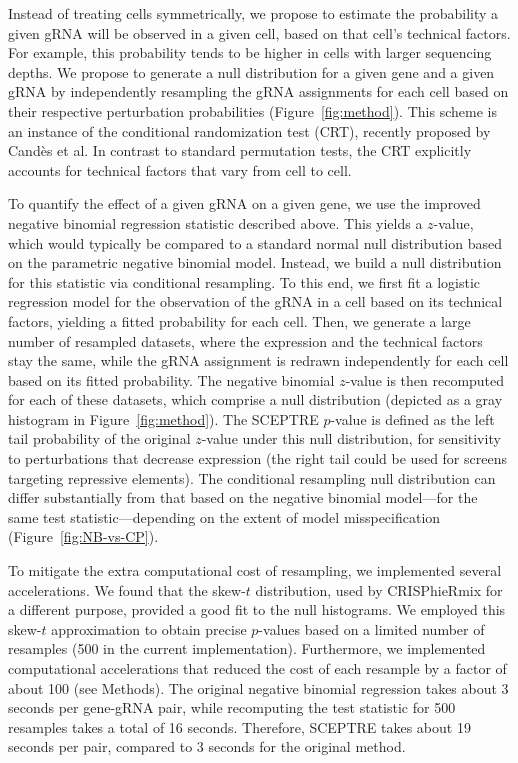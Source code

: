 \documentclass{nature}
\begin{document}
Instead of treating cells symmetrically, we propose to estimate the probability a given gRNA will be observed in a given cell, based on that cell's technical factors. For example, this probability tends to be higher in cells with larger sequencing depths. We propose to generate a null distribution for a given gene and a given gRNA by independently resampling the gRNA assignments for each cell based on their respective perturbation probabilities (Figure~\ref{fig:method}). This scheme is an instance of the conditional randomization test (CRT), recently proposed by Cand\`{e}s et al.\cite{CetL16} In contrast to standard permutation tests, the CRT explicitly accounts for technical factors that vary from cell to cell.

To quantify the effect of a given gRNA on a given gene, we use the improved negative binomial regression statistic described above. This yields a $z$-value, which would typically be compared to a standard normal null distribution based on the parametric negative binomial model. Instead, we build a null distribution for this statistic via conditional resampling. To this end, we first fit a logistic regression model for the observation of the gRNA in a cell based on its technical factors, yielding a fitted probability for each cell. Then, we generate a large number of resampled datasets, where the expression and the technical factors stay the same, while the gRNA assignment is redrawn independently for each cell based on its fitted probability. The negative binomial $z$-value is then recomputed for each of these datasets, which comprise a null distribution (depicted as a gray histogram in Figure~\ref{fig:method}). The SCEPTRE $p$-value is defined as the left tail probability of the original $z$-value under this null distribution, for sensitivity to perturbations that decrease expression (the right tail could be used for screens targeting repressive elements). The conditional resampling null distribution can differ substantially from that based on the negative binomial model---for the same test statistic---depending on the extent of model misspecification (Figure~\ref{fig:NB-vs-CP}).

To mitigate the extra computational cost of resampling, we implemented several accelerations. We found that the skew-$t$ distribution, used by CRISPhieRmix\cite{Daley2018} for a different purpose, provided a good fit to the null histograms. We employed this skew-$t$ approximation to obtain precise $p$-values based on a limited number of resamples (500 in the current implementation). Furthermore, we implemented computational accelerations that reduced the cost of each resample by a factor of about 100 (see Methods). The original negative binomial regression takes about 3 seconds per gene-gRNA pair, while recomputing the test statistic for 500 resamples takes a total of 16 seconds. Therefore, SCEPTRE takes about 19 seconds per pair, compared to 3 seconds for the original method.
\end{document}

